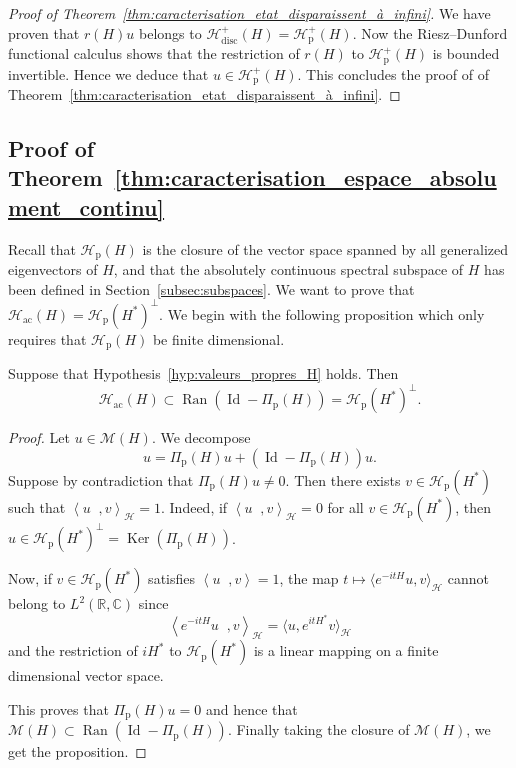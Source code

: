 \documentclass[10pt]{amsart}
\theoremstyle{definition}\newtheorem{defi}[theo]{Definition}\newtheorem{rema}[theo]{Remark}\newtheorem{exam}[theo]{Example}\newtheorem{exem}[theo]{Example}\newtheorem{nota}[theo]{Notation}
\newcommand{\Hi}{\mathcal{H}}
\newcommand{\bbC}{\mathbb{C}}
\newcommand{\R}{\mathbb{R}}
\newcommand{\rmp}{\mathrm{p}}
\newcommand{\acr}{\mathrm{ac}}
\newcommand{\disc}{\mathrm{disc}}
\newcommand{\scal}[2]{\left\langle{#1} \middle., {#2}\right\rangle}
\DeclareMathOperator{\Ran}{Ran}
\DeclareMathOperator{\Ker}{Ker}
\DeclareMathOperator{\Id}{Id}
\begin{document}
\begin{proof}[Proof of Theorem~\ref{thm:caracterisation_etat_disparaissent_à_infini}]
We have proven that $r(H) u$ belongs to $\Hi_{\disc}^+(H)=\Hi_{\rmp}^+(H)$. Now the Riesz--Dunford functional calculus shows that the restriction of $r(H)$ to $\Hi_{\rmp}^+(H)$ is bounded invertible. Hence we deduce that $u\in\Hi_{\rmp}^+(H)$. This concludes the proof of of Theorem~\ref{thm:caracterisation_etat_disparaissent_à_infini}.
\end{proof}


\subsection{Proof of Theorem~\ref{thm:caracterisation_espace_absolument_continu}}\label{subsec:abs_cont}

Recall that $\Hi_{\rmp}(H)$ is the closure of the vector space spanned by all generalized eigenvectors of $H$, and that the absolutely continuous spectral subspace of $H$ has been defined in Section~\ref{subsec:subspaces}. We want to prove that $\Hi_\acr(H)=\Hi_\rmp(H^*)^\perp$. We begin with the following proposition which only requires that $\Hi_\rmp(H)$ be finite dimensional.

\begin{prop}\label{prop:easy_incl_ac}
Suppose that Hypothesis~\ref{hyp:valeurs_propres_H} holds. Then
\begin{equation*}
\Hi_\acr(H)\subset\Ran(\Id-\Pi_\rmp(H))=\Hi_\rmp(H^*)^\perp.
\end{equation*}
\end{prop}


\begin{proof}
Let $u\in\mathcal{M}(H)$. We decompose
\begin{equation*}
u=\Pi_\rmp(H)u+(\Id-\Pi_\rmp(H))u.
\end{equation*}
Suppose by contradiction that $\Pi_\rmp(H) u\neq 0$. Then there exists $v\in\Hi_\rmp(H^*)$ such that $\scal{u}{v}_\Hi=1$. Indeed, if $\scal{u}{v}_\Hi=0$ for all $v\in\Hi_\rmp(H^*)$, then $u\in\Hi_\rmp(H^*)^\perp=\Ker(\Pi_\rmp(H))$.

Now, if $v\in\Hi_\rmp(H^*)$ satisfies $\scal{u}{v}=1$, the map $t\mapsto\langle e^{-itH}u, v\rangle_\Hi$ cannot belong to $L^2(\R,\bbC)$ since
\begin{equation*}
\scal{e^{-itH}u}{v}_\Hi=\big \langle u,e^{itH^*}v \big\rangle_\Hi
\end{equation*}
and the restriction of $iH^*$ to $\Hi_\rmp(H^*)$ is a linear mapping on a finite dimensional vector space.

This proves that $\Pi_\rmp(H) u=0$ and hence that $\mathcal{M}(H)\subset\Ran(\Id-\Pi_\rmp(H))$. Finally taking the closure of $\mathcal{M}(H)$, we get the proposition.
\end{proof}
\end{document}
